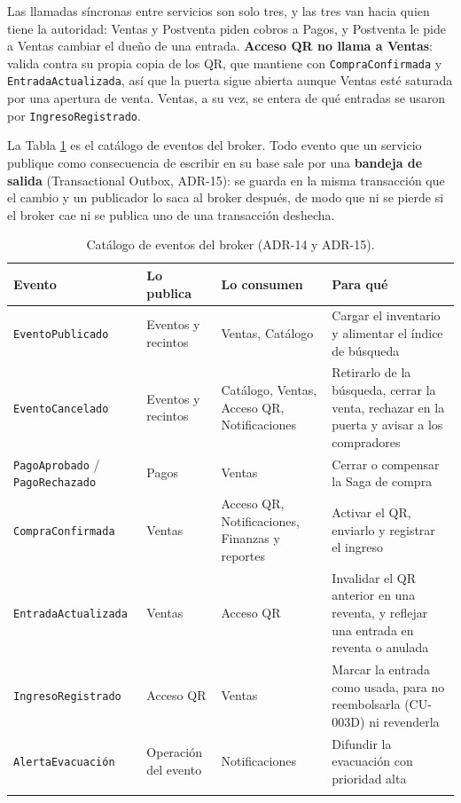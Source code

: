 Las llamadas síncronas entre servicios son solo tres, y las tres van hacia quien tiene la
autoridad: Ventas y Postventa piden cobros a Pagos, y Postventa le pide a Ventas cambiar el dueño
de una entrada. \textbf{Acceso QR no llama a Ventas}: valida contra su propia copia de los QR, que
mantiene con \texttt{CompraConfirmada} y \texttt{EntradaActualizada}, así que la puerta sigue
abierta aunque Ventas esté saturada por una apertura de venta. Ventas, a su vez, se entera de qué
entradas se usaron por \texttt{IngresoRegistrado}.

La Tabla \ref{tab:eventos} es el catálogo de eventos del broker. Todo evento que un servicio
publique como consecuencia de escribir en su base sale por una \textbf{bandeja de salida}
(Transactional Outbox, ADR-15): se guarda en la misma transacción que el cambio y un publicador lo
saca al broker después, de modo que ni se pierde si el broker cae ni se publica uno de una
transacción deshecha.

\begin{center}
\begin{longtable}{p{3.4cm}p{2.9cm}p{3.6cm}p{4.4cm}}
\toprule
\textbf{Evento} & \textbf{Lo publica} & \textbf{Lo consumen} & \textbf{Para qué}\\
\midrule
\endhead
\texttt{EventoPublicado} & Eventos y recintos & Ventas, Catálogo & Cargar el inventario y alimentar
el índice de búsqueda\\[0.3em]
\texttt{EventoCancelado} & Eventos y recintos & Catálogo, Ventas, Acceso QR, Notificaciones &
Retirarlo de la búsqueda, cerrar la venta, rechazar en la puerta y avisar a los compradores\\[0.3em]
\texttt{PagoAprobado} / \texttt{PagoRechazado} & Pagos & Ventas & Cerrar o compensar la Saga de
compra\\[0.3em]
\texttt{CompraConfirmada} & Ventas & Acceso QR, Notificaciones, Finanzas y reportes & Activar el QR,
enviarlo y registrar el ingreso\\[0.3em]
\texttt{EntradaActualizada} & Ventas & Acceso QR & Invalidar el QR anterior en una reventa, y
reflejar una entrada en reventa o anulada\\[0.3em]
\texttt{IngresoRegistrado} & Acceso QR & Ventas & Marcar la entrada como usada, para no
reembolsarla (CU-003D) ni revenderla\\[0.3em]
\texttt{AlertaEvacuación} & Operación del evento & Notificaciones & Difundir la evacuación con
prioridad alta\\
\bottomrule
\caption{Catálogo de eventos del broker (ADR-14 y ADR-15).}
\label{tab:eventos}
\end{longtable}
\end{center}

